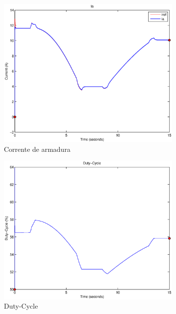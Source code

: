 \documentclass{article}
\begin{document}
\begin{figure}[H]
\begin{subfigure}{0.32\textwidth}
		\includegraphics[width=\linewidth]{matlab/ia5}
		\caption{Corrente de armadura}
	\end{subfigure}
	\begin{subfigure}{0.32\textwidth}
		\includegraphics[width=\linewidth]{matlab/d5}
		\caption{Duty-Cycle}
	\end{subfigure}
	\begin{subfigure}{0.32\textwidth}

\end{subfigure}
\end{figure}
\end{document}

